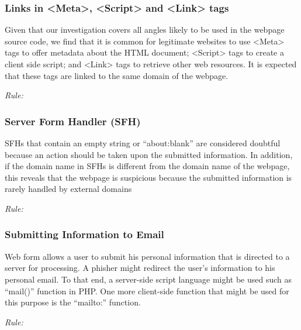 \documentclass[twocolumn,10pt]{article}
\begin{document}
\subsubsection{Links in <Meta>, <Script> and <Link> tags}

Given that our investigation covers all angles likely to be used in the webpage source code, we find that it is common for legitimate websites to use <Meta> tags to offer metadata about the HTML document; <Script> tags to create a client side script; and <Link> tags to retrieve other web resources. It is expected that these tags are linked to the same domain of the webpage. 
\begin{center}
\it Rule:
\end{center}%
\subsubsection{Server Form Handler (SFH)}

SFHs that contain an empty string or “about:blank” are considered doubtful because an action should
be taken upon the submitted information. In addition, if the domain name in SFHs is different from
the domain name of the webpage, this reveals that the webpage is suspicious because the submitted
information is rarely handled by external domains
\begin{center}
\it Rule:
\end{center}%
\subsubsection{Submitting Information to Email}
Web form allows a user to submit his personal information that is directed to a server for processing.
A phisher might redirect the user’s information to his personal email. To that end, a server-side script
language might be used such as “mail()” function in PHP. One more client-side function that might be
used for this purpose is the “mailto:” function. 
\begin{center}
\it Rule:
\end{center}
\end{document}
